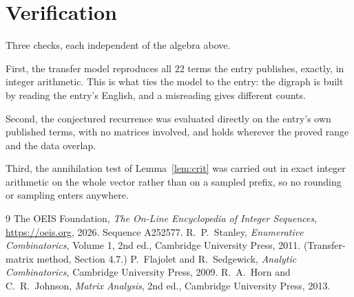 \documentclass[11pt,a4paper]{article}
\theoremstyle{plain}
\theoremstyle{definition}
\begin{document}
\section{Verification}

Three checks, each independent of the algebra above.

First, the transfer model reproduces all $22$ terms the entry publishes, exactly, in
integer arithmetic. This is what ties the model to the entry: the digraph is built by reading
the entry's English, and a misreading gives different counts.

Second, the conjectured recurrence was evaluated directly on the entry's own published terms,
with no matrices involved, and holds wherever the proved range and the data overlap.

Third, the annihilation test of Lemma~\ref{lem:crit} was carried out in exact integer
arithmetic on the whole vector rather than on a sampled prefix, so no rounding or sampling
enters anywhere.

\begin{thebibliography}{9}
 The OEIS Foundation, \emph{The On-Line Encyclopedia of Integer
Sequences}, \url{https://oeis.org}, 2026. Sequence A252577.
 R.~P.~Stanley, \emph{Enumerative Combinatorics}, Volume 1, 2nd ed.,
Cambridge University Press, 2011. (Transfer-matrix method, Section 4.7.)
 P.~Flajolet and R.~Sedgewick, \emph{Analytic Combinatorics}, Cambridge
University Press, 2009.
 R.~A.~Horn and C.~R.~Johnson, \emph{Matrix Analysis}, 2nd ed., Cambridge
University Press, 2013.
\end{thebibliography}
\end{document}
